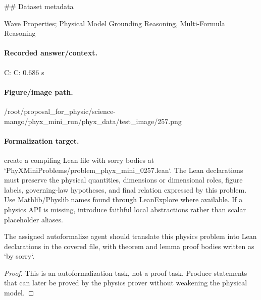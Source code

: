 \#\# Dataset metadata

Wave Properties; Physical Model Grounding Reasoning, Multi-Formula Reasoning

\paragraph{Recorded answer/context.}
C: C: 0.686 s

\paragraph{Figure/image path.}
/root/proposal\_for\_physic/science-mango/phyx\_mini\_run/phyx\_data/test\_image/257.png

\paragraph{Formalization target.}
create a compiling Lean file with sorry bodies at `PhyXMiniProblems/problem\_phyx\_mini\_0257.lean`. The Lean declarations must preserve the physical quantities, dimensions or dimensional roles, figure labels, governing-law hypotheses, and final relation expressed by this problem.
Use Mathlib/Physlib names found through LeanExplore where available. If a physics API is missing, introduce faithful local abstractions rather than scalar placeholder aliases.

\begin{theorem}
\label{thm:physics:phyx_mini_0257:target}
The assigned autoformalize agent should translate this physics problem into Lean declarations in the covered file, with theorem and lemma proof bodies written as `by sorry`.
\end{theorem}
\begin{proof}
This is an autoformalization task, not a proof task. Produce statements that can later be proved by the physics prover without weakening the physical model.
\end{proof}

